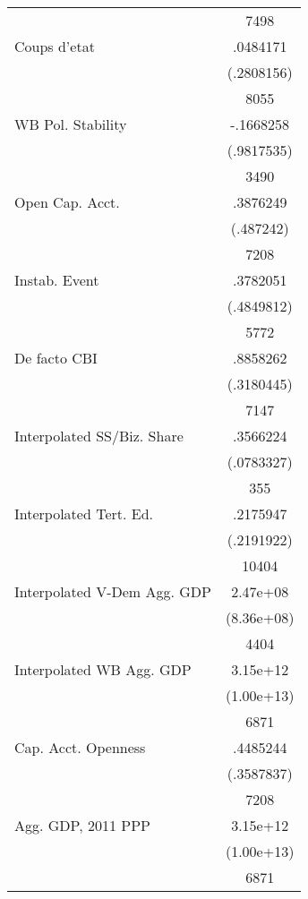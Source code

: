 {\begin{longtable}{l*{1}{c}}
                    &        7498\\
Coups d'etat        &    .0484171\\
                    &  (.2808156)\\
                    &        8055\\
WB Pol. Stability   &   -.1668258\\
                    &  (.9817535)\\
                    &        3490\\
Open Cap. Acct.     &    .3876249\\
                    &   (.487242)\\
                    &        7208\\
Instab. Event       &    .3782051\\
                    &  (.4849812)\\
                    &        5772\\
De facto CBI        &    .8858262\\
                    &  (.3180445)\\
                    &        7147\\
Interpolated SS/Biz. Share&    .3566224\\
                    &  (.0783327)\\
                    &         355\\
Interpolated Tert. Ed.&    .2175947\\
                    &  (.2191922)\\
                    &       10404\\
Interpolated V-Dem Agg. GDP&    2.47e+08\\
                    &  (8.36e+08)\\
                    &        4404\\
Interpolated WB Agg. GDP&    3.15e+12\\
                    &  (1.00e+13)\\
                    &        6871\\
Cap. Acct. Openness &    .4485244\\
                    &  (.3587837)\\
                    &        7208\\
Agg. GDP, 2011 PPP  &    3.15e+12\\
                    &  (1.00e+13)\\
                    &        6871\\

\end{longtable}}
